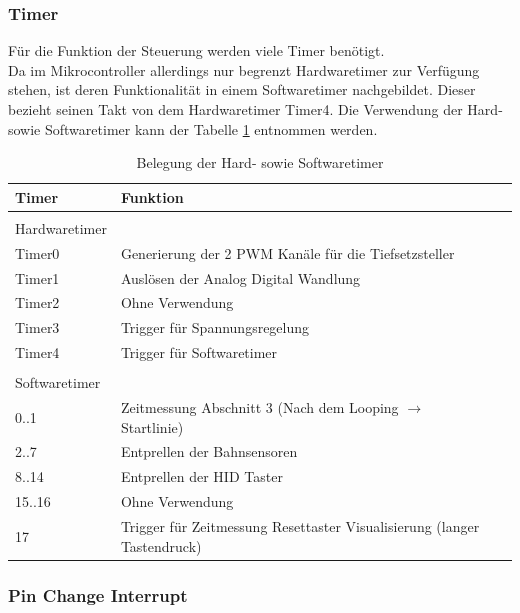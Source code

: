 \documentclass[a4paper, 11pt]{report}
\begin{document}
			\subsubsection{Timer}\label{subsubsec:Timer}
			Für die Funktion der Steuerung werden viele Timer benötigt.\\
			Da im Mikrocontroller allerdings nur begrenzt Hardwaretimer zur Verfügung stehen, ist deren Funktionalität in einem Softwaretimer nachgebildet.
			Dieser bezieht seinen Takt von dem  Hardwaretimer \glqq Timer4\grqq.
			Die Verwendung der Hard- sowie Softwaretimer kann der Tabelle \ref{tab:belegungTimer} entnommen werden.
				\begin{table}[ht]
					\caption{Belegung der Hard- sowie Softwaretimer}
					\begin{tabular}{|l|l|l|}
						\hline
						\textbf{Timer} & \textbf{Funktion}\\
						\hline
						\hline
						 & \\
						Hardwaretimer &\\
						\hline
						\hline
						Timer0 & Generierung der 2 PWM Kanäle für die Tiefsetzsteller\\
						\hline
						Timer1 & Auslösen der Analog Digital Wandlung\\
						\hline
						Timer2 & Ohne Verwendung\\
						\hline
						Timer3 & Trigger für Spannungsregelung\\
						\hline
						Timer4 & Trigger für Softwaretimer\\
						\hline
						\hline
						 & \\
						Softwaretimer &\\
						\hline
						\hline
						0..1 & Zeitmessung Abschnitt 3 (Nach dem Looping $\rightarrow$ Startlinie)\\
						\hline
						2..7 & Entprellen der Bahnsensoren\\
						\hline
						8..14 & Entprellen der HID Taster\\
						\hline
						15..16 & Ohne Verwendung\\
						\hline
						17 & Trigger für Zeitmessung Resettaster Visualisierung (langer Tastendruck)\\
						\hline
					\end{tabular}
					
					\label{tab:belegungTimer}
				\end{table}
			\subsubsection {Pin Change Interrupt}\label{subsubsec:PCINT}
			
\end{document}

